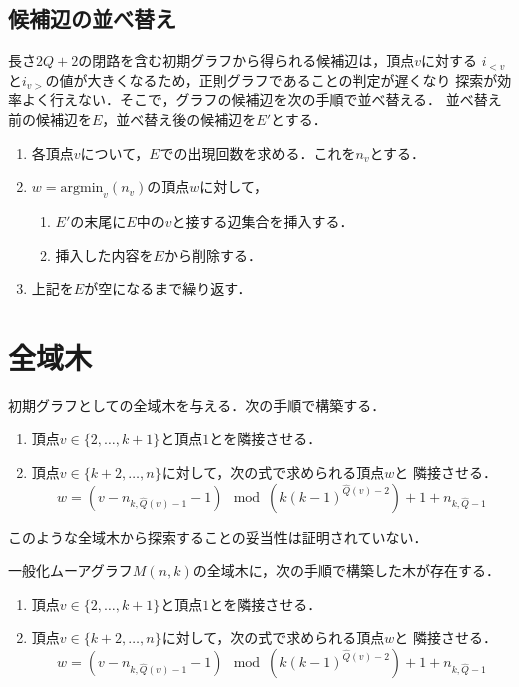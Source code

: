\subsection*{候補辺の並べ替え}
長さ$2Q+2$の閉路を含む初期グラフから得られる候補辺は，頂点$v$に対する
$i_{<v}$と$i_{v>}$の値が大きくなるため，正則グラフであることの判定が遅くなり
探索が効率よく行えない．そこで，グラフの候補辺を次の手順で並べ替える．
並べ替え前の候補辺を$E$，並べ替え後の候補辺を$E'$とする．
\begin{enumerate}
\item 各頂点$v$について，$E$での出現回数を求める．これを$n_v$とする．
\item $w=\mathrm{argmin}_{v}(n_v)$の頂点$w$に対して，
  \begin{enumerate}
  \item $E'$の末尾に$E$中の$v$と接する辺集合を挿入する．
  \item 挿入した内容を$E$から削除する．
  \end{enumerate}
\item 上記を$E$が空になるまで繰り返す．
\end{enumerate}

\section{全域木}
\label{sect:initial-spanning-tree}
初期グラフとしての全域木を与える．次の手順で構築する．
\begin{enumerate}
\item 頂点$v\in\{2,\ldots,k+1\}$と頂点$1$とを隣接させる．
\item 頂点$v\in\{k+2,\ldots,n\}$に対して，次の式で求められる頂点$w$と
  隣接させる．
  \[ w=(v-n_{k,\hat{Q}(v)-1}-1)\mod(k(k-1)^{\hat{Q}(v)-2})+1+n_{k,\hat{Q}-1} \]
\end{enumerate}
このような全域木から探索することの妥当性は証明されていない．
\begin{conjecture}
  \label{conj:spanning-tree}
  一般化ムーアグラフ$M(n,k)$の全域木に，次の手順で構築した木が存在する．
  \begin{enumerate}
  \item 頂点$v\in\{2,\ldots,k+1\}$と頂点$1$とを隣接させる．
  \item 頂点$v\in\{k+2,\ldots,n\}$に対して，次の式で求められる頂点$w$と
    隣接させる．
    \[w=(v-n_{k,\hat{Q}(v)-1}-1)\mod(k(k-1)^{\hat{Q}(v)-2})+1+n_{k,\hat{Q}-1}\]
  \end{enumerate}
\end{conjecture}

